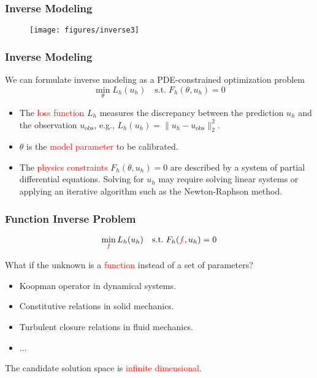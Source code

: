 \documentclass[usenames,dvipsnames]{beamer}
\begin{document}
\begin{frame}
	\frametitle{Inverse Modeling}
	\begin{figure}
	\centering
  \texttt{[image: figures/inverse3]}
\end{figure}
\end{frame}

\begin{frame}
	\frametitle{Inverse Modeling}
	We can formulate inverse modeling as a PDE-constrained optimization problem 
	\begin{equation*}
		\min_{\theta} L_h(u_h) \quad \mathrm{s.t.}\; F_h(\theta, u_h) = 0
	\end{equation*}
	\begin{itemize}
		\item The \textcolor{red}{loss function} $L_h$ measures the discrepancy between the prediction $u_h$ and the observation $u_{\mathrm{obs}}$, e.g., $L_h(u_h) = \|u_h - u_{\mathrm{obs}}\|_2^2$. 
		\item $\theta$ is the \textcolor{red}{model parameter} to be calibrated. 
		\item The \textcolor{red}{physics constraints} $F_h(\theta, u_h)=0$ are described by a system of partial differential equations. Solving for $u_h$ may require solving linear systems or applying an iterative algorithm such as the Newton-Raphson method. 
	\end{itemize}
\end{frame}

\begin{frame}
	\frametitle{Function Inverse Problem}
	
	\begin{equation*}
		\min_{\textcolor{red}{f}} L_h(u_h) \quad \mathrm{s.t.}\; F_h(\textcolor{red}{f}, u_h) = 0
	\end{equation*}
	
	What if the unknown is a \textcolor{red}{function} instead of a set of parameters?
\begin{itemize}
	\item Koopman operator in dynamical systems.
	\item Constitutive relations in solid mechanics. 
	\item Turbulent closure relations in fluid mechanics.
	\item ...
\end{itemize}

The candidate solution space is \textcolor{red}{infinite dimensional}.

\end{frame}
\end{document}
